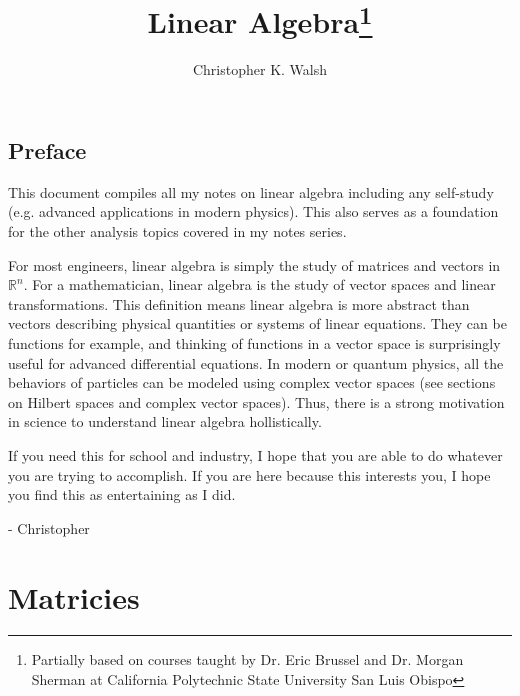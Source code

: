 \documentclass[12pt,openany]{book}
\title{Linear Algebra\thanks{Partially based on courses taught by Dr. Eric Brussel and Dr. Morgan Sherman at California Polytechnic State University San Luis Obispo}}
\author{Christopher K. Walsh}
\theoremstyle{mydefinitionstyle}
\theoremstyle{myexamplestyle}
\theoremstyle{remark}
\begin{document}
\maketitle
\tableofcontents

\newpage
\section*{Preface}
This document compiles all my notes on linear algebra including any self-study (e.g. advanced applications in modern physics).
This also serves as a foundation for the other analysis topics covered in my notes series.

For most engineers, linear algebra is simply the study of matrices and vectors in \( \mathbb{R}^n \).
For a mathematician, linear algebra is the study of vector spaces and linear transformations.
This definition means linear algebra is more abstract than vectors describing physical quantities or systems of linear equations.
They can be functions for example, and thinking of functions in a vector space is surprisingly useful for advanced differential equations.
In modern or quantum physics, all the behaviors of particles can be modeled using complex vector spaces (see sections on Hilbert spaces and complex vector spaces).
Thus, there is a strong motivation in science to understand linear algebra hollistically.

If you need this for school and industry, I hope that you are able to do whatever you are trying to accomplish.
If you are here because this interests you, I hope you find this as entertaining as I did.

- Christopher


\chapter{Matricies}

\end{document}
